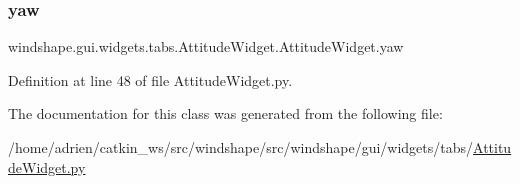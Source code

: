 \subsubsection{\texorpdfstring{yaw}{yaw}}
{\footnotesize\ttfamily windshape.\+gui.\+widgets.\+tabs.\+Attitude\+Widget.\+Attitude\+Widget.\+yaw}



Definition at line 48 of file Attitude\+Widget.\+py.



The documentation for this class was generated from the following file\+:\begin{DoxyCompactItemize}
\item 
/home/adrien/catkin\+\_\+ws/src/windshape/src/windshape/gui/widgets/tabs/\mbox{\hyperlink{_attitude_widget_8py}{Attitude\+Widget.\+py}}\end{DoxyCompactItemize}
